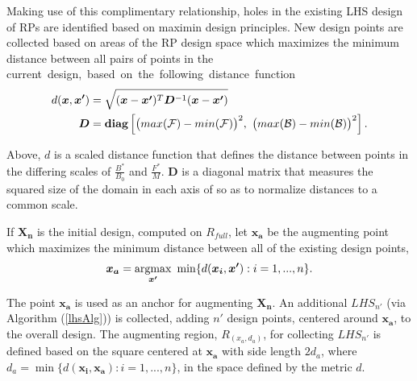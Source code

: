 Making use of this complimentary relationship, holes in the existing LHS design
of RPs are identified based on maximin design principles.
New design points are collected based on areas of the RP design
space which maximizes the minimum distance between all pairs of points in the
\mbox{current design, based on the following distance function}
\begin{align}
d(\bm{x}, \bm{x'}) &= \sqrt{(\bm{x}-\bm{x'})^T\bm{D}^{-1}(\bm{x}-\bm{x'})}\\
\bm{D} &= \bm{\mbox{diag}\left[} \big(max(\mathcal{F})-min(\mathcal{F})\big)^2, ~\big(max(\mathcal{B})-min(\mathcal{B})\big)^2 \bm{\right]}. \nonumber
\end{align}

%
Above, $d$ is a scaled distance function that defines the distance between
points in the differing scales of $\frac{B^*}{B_0}$ and $\frac{F^*}{M}$.
$\bm{D}$ is a diagonal matrix that measures the squared size of the domain in each 
axis of so as to normalize distances to a common scale.

%
If $\bm{X_n}$ is the initial design, computed on $R_{full}$, let $\bm{x_a}$ be the 
augmenting point which maximizes the minimum distance between all of the existing
design points,
%
\begin{align}
        \bm{x_a} = \argmax_{\bm{x'}} ~\min\{ d(\bm{x_i}, \bm{x'}): i=1,...,n \}.
\end{align}
%

%
The point $\bm{x_a}$ is used as an anchor for augmenting $\bm{X_n}$. %
An additional $LHS_{n'}$ (via Algorithm (\ref{lhsAlg})) is collected, adding
$n'$ design points, centered around $\bm{x_a}$, to the overall design. %
The augmenting region, $R_{(x_a, d_a)}$, for collecting $LHS_{n'}$ is defined
based on the square centered at $\bm{x_a}$ with side length $2d_a$, where
\mbox{$d_a = \min\{ d(\bm{x_i}, \bm{x_a}): i=1,...,n \}$}, in the space defined
by the metric $d$.
%


